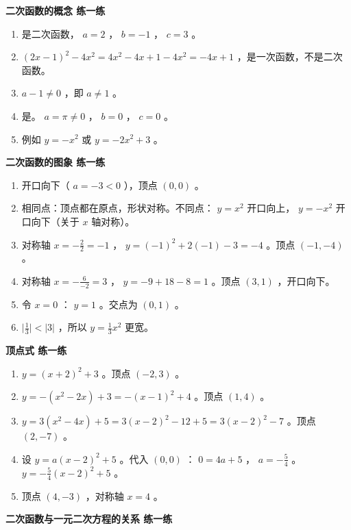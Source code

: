 \begin{answer}


\textbf{二次函数的概念 练一练}

\begin{enumerate}
  \item 是二次函数， $a = 2$ ， $b = -1$ ， $c = 3$ 。
  \item $(2x-1)^2 - 4x^2 = 4x^2 - 4x + 1 - 4x^2 = -4x + 1$ ，是一次函数，不是二次函数。
  \item $a - 1 \neq 0$ ，即 $a \neq 1$ 。
  \item 是。 $a = \pi \neq 0$ ， $b = 0$ ， $c = 0$ 。
  \item 例如 $y = -x^2$ 或 $y = -2x^2 + 3$ 。
\end{enumerate}


\textbf{二次函数的图象 练一练}

\begin{enumerate}
  \item 开口向下（ $a = -3 < 0$ ），顶点 $(0, 0)$ 。
  \item 相同点：顶点都在原点，形状对称。不同点： $y = x^2$ 开口向上， $y = -x^2$ 开口向下（关于 $x$ 轴对称）。
  \item 对称轴 $x = -\frac{2}{2} = -1$ ， $y = (-1)^2 + 2(-1) - 3 = -4$ 。顶点 $(-1, -4)$ 。
  \item 对称轴 $x = -\frac{6}{-2} = 3$ ， $y = -9 + 18 - 8 = 1$ 。顶点 $(3, 1)$ ，开口向下。
  \item 令 $x = 0$ ： $y = 1$ 。交点为 $(0, 1)$ 。
  \item $\lvert \frac{1}{3} \rvert < \lvert 3 \rvert$ ，所以 $y = \frac{1}{3}x^2$ 更宽。
\end{enumerate}


\textbf{顶点式 练一练}

\begin{enumerate}
  \item $y = (x + 2)^2 + 3$ 。顶点 $(-2, 3)$ 。
  \item $y = -(x^2 - 2x) + 3 = -(x-1)^2 + 4$ 。顶点 $(1, 4)$ 。
  \item $y = 3(x^2 - 4x) + 5 = 3(x-2)^2 - 12 + 5 = 3(x-2)^2 - 7$ 。顶点 $(2, -7)$ 。
  \item 设 $y = a(x-2)^2 + 5$ 。代入 $(0, 0)$ ： $0 = 4a + 5$ ， $a = -\frac{5}{4}$ 。 $y = -\frac{5}{4}(x-2)^2 + 5$ 。
  \item 顶点 $(4, -3)$ ，对称轴 $x = 4$ 。
\end{enumerate}


\textbf{二次函数与一元二次方程的关系 练一练}


\end{answer}
